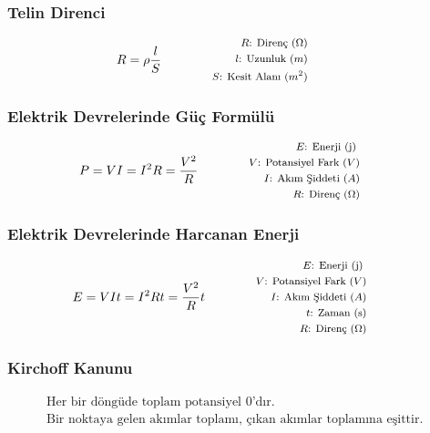 \subsubsection*{Telin Direnci}
\begin{equation}
    R = \rho \frac{l}{S} \qquad \qquad \parbox{4cm}{\footnotesize$\begin{aligned}
        R\text{: Direnç } (\Omega) \\
        l\text{: Uzunluk } (m) \\
        S\text{: Kesit Alanı } (m^2)
\end{aligned}$}
\end{equation}

\subsubsection*{Elektrik Devrelerinde Güç Formülü}
\begin{equation}
    P = VI = I^2 R = \frac{V^2}{R} \qquad \qquad \parbox{4cm}{\footnotesize$\begin{aligned}
        E\text{: Enerji (j) } \\
        V\text{: Potansiyel Fark } (V) \\
        I\text{: Akım Şiddeti } (A) \\
        R\text{: Direnç } (\Omega)
\end{aligned}$}
\end{equation}

\subsubsection*{Elektrik Devrelerinde Harcanan Enerji}
\begin{equation}
    E = VIt = I^2Rt = \frac{V^2}{R}t \qquad \qquad \parbox{4cm}{\footnotesize$\begin{aligned}
        E\text{: Enerji (j) } \\
        V\text{: Potansiyel Fark } (V) \\
        I\text{: Akım Şiddeti } (A) \\
        t\text{: Zaman (s)} \\
        R\text{: Direnç } (\Omega)
\end{aligned}$}
\end{equation}

\subsubsection*{Kirchoff Kanunu}
\begin{equation*}
  \begin{aligned}
    \text{Her bir döngüde toplam potansiyel 0'dır. } \\
    \text{Bir noktaya gelen akımlar toplamı, çıkan akımlar toplamına eşittir. }
    \end{aligned}
\end{equation*}
